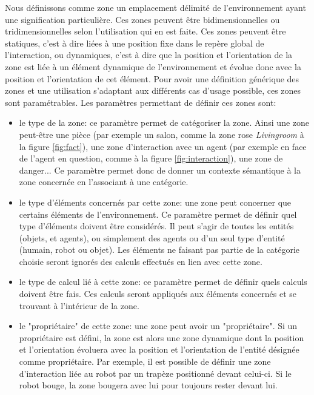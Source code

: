 \documentclass[a4paper,11pt,twoside]{StyleThese}
\begin{document}
Nous définissons comme zone un emplacement délimité de l'environnement ayant une signification particulière. Ces zones peuvent être bidimensionnelles ou tridimensionnelles selon l'utilisation qui en est faite. Ces zones peuvent être statiques, c'est à dire liées à une position fixe dans le repère global de l'interaction, ou dynamiques, c'est à dire que la position et l'orientation de la zone est liée à un élément dynamique de l'environnement et évolue donc avec la position et l'orientation de cet élément. Pour avoir une définition générique des zones et une utilisation s'adaptant aux différents cas d'usage possible, ces zones sont paramétrables. Les paramètres permettant de définir ces zones sont:
\begin{itemize}
\item le type de la zone: ce paramètre permet de catégoriser la zone. Ainsi une zone peut-être une pièce (par exemple un salon, comme la zone rose \textit{Livingroom} à la figure \ref{fig:fact}), une zone d'interaction avec un agent (par exemple en face de l'agent en question, comme à la figure \ref{fig:interaction}), une zone de danger...
Ce paramètre permet donc de donner un contexte sémantique à la zone concernée en l'associant à une catégorie.
\item le type d'éléments concernés par cette zone: une zone peut concerner que certains éléments de l'environnement. Ce paramètre permet de définir quel type d'éléments doivent être considérés. Il peut s'agir de toutes les entités (objets, et agents), ou simplement des agents ou d'un seul type d'entité (humain, robot ou objet). Les éléments ne faisant pas partie de la catégorie choisie seront ignorés des calculs effectués en lien avec cette zone.
\item le type de calcul lié à cette zone: ce paramètre permet de définir quels calculs doivent être fais. Ces calculs seront appliqués aux éléments concernés et se trouvant à l'intérieur de la zone.
\item le "propriétaire" de cette zone: une zone peut avoir un "propriétaire". Si un propriétaire est défini, la zone est alors une zone dynamique dont la position et l'orientation évoluera avec la position et l'orientation de l'entité désignée comme propriétaire. Par exemple, il est possible de définir une zone d'interaction liée au robot par un trapèze positionné devant celui-ci. Si le robot bouge, la zone bougera avec lui pour toujours rester devant lui.
\end{itemize}
\end{document}
